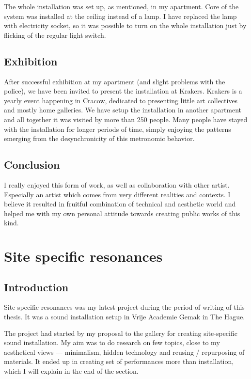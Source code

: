 \documentclass[12pt,a4paper,oneside]{report}
\begin{document}
The whole installation was set up, as mentioned, in my apartment. Core of the system was installed at the ceiling instead of a lamp. I have replaced the lamp with electricity socket, so it was possible to turn on the whole installation just by flicking of the regular light switch.

\subsection{Exhibition} After successful exhibition at my apartment (and slight problems with the police), we have been invited to present the installation at Krakers. Krakers is a yearly event happening in Cracow, dedicated to presenting little art collectives and mostly home galleries. We have setup the installation in another apartment and all together it was visited by more than 250 people. Many people have stayed with the installation for longer periods of time, simply enjoying the patterns emerging from the desynchronicity of this metronomic behavior.

\subsection{Conclusion} I really enjoyed this form of work, as well as collaboration with other artist. Especially an artist which comes from very different realities and contexts. I believe it resulted in fruitful combination of technical and aesthetic world and helped me with my own personal attitude towards creating public works of this kind.

\clearpage
\section{Site specific resonances}
\subsection{Introduction}
Site specific resonances was my latest project during the period of writing of this thesis. It was a sound installation setup in Vrije Academie Gemak in The Hague.

The project had started by my proposal to the gallery for creating site-specific sound installation. My aim was to do research on few topics, close to my aesthetical views --- minimalism, hidden technology and reusing / repurposing of materials. It ended up in creating set of performances more than installation, which I will explain in the end of the section.
\end{document}
